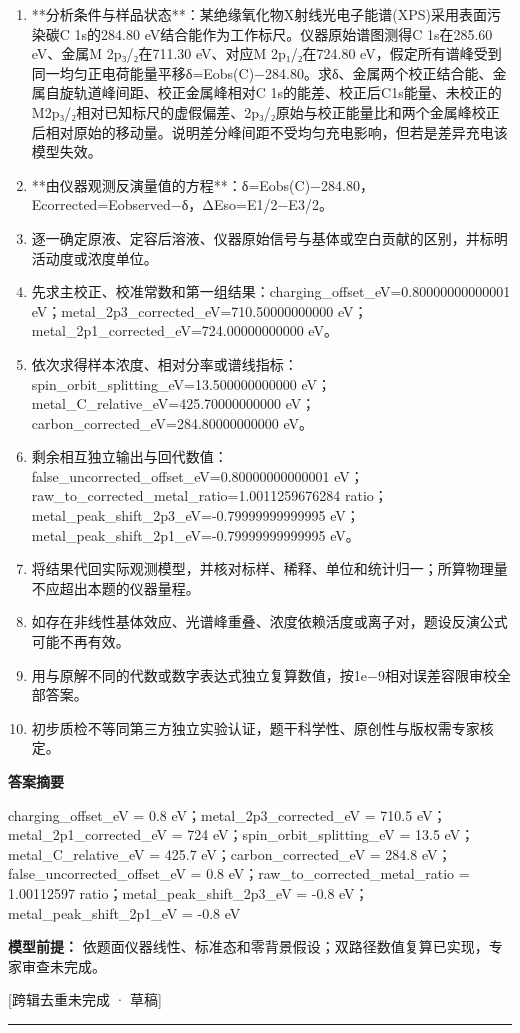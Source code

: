 \documentclass[UTF8,11pt,a4paper]{ctexart}
\begin{document}
\begin{enumerate}
\item **分析条件与样品状态**：某绝缘氧化物X射线光电子能谱(XPS)采用表面污染碳C 1s的284.80 eV结合能作为工作标尺。仪器原始谱图测得C 1s在285.60 eV、金属M 2p₃/₂在711.30 eV、对应M 2p₁/₂在724.80 eV，假定所有谱峰受到同一均匀正电荷能量平移δ=Eobs(C)−284.80。求δ、金属两个校正结合能、金属自旋轨道峰间距、校正金属峰相对C 1s的能差、校正后C1s能量、未校正的M2p₃/₂相对已知标尺的虚假偏差、2p₃/₂原始与校正能量比和两个金属峰校正后相对原始的移动量。说明差分峰间距不受均匀充电影响，但若是差异充电该模型失效。
\item **由仪器观测反演量值的方程**：δ=Eobs(C)−284.80，Ecorrected=Eobserved−δ，ΔEso=E1/2−E3/2。
\item 逐一确定原液、定容后溶液、仪器原始信号与基体或空白贡献的区别，并标明活动度或浓度单位。
\item 先求主校正、校准常数和第一组结果：charging\_offset\_eV=0.80000000000001 eV；metal\_2p3\_corrected\_eV=710.50000000000 eV；metal\_2p1\_corrected\_eV=724.00000000000 eV。
\item 依次求得样本浓度、相对分率或谱线指标：spin\_orbit\_splitting\_eV=13.500000000000 eV；metal\_C\_relative\_eV=425.70000000000 eV；carbon\_corrected\_eV=284.80000000000 eV。
\item 剩余相互独立输出与回代数值：false\_uncorrected\_offset\_eV=0.80000000000001 eV；raw\_to\_corrected\_metal\_ratio=1.0011259676284 ratio；metal\_peak\_shift\_2p3\_eV=-0.79999999999995 eV；metal\_peak\_shift\_2p1\_eV=-0.79999999999995 eV。
\item 将结果代回实际观测模型，并核对标样、稀释、单位和统计归一；所算物理量不应超出本题的仪器量程。
\item 如存在非线性基体效应、光谱峰重叠、浓度依赖活度或离子对，题设反演公式可能不再有效。
\item 用与原解不同的代数或数字表达式独立复算数值，按1e−9相对误差容限审校全部答案。
\item 初步质检不等同第三方独立实验认证，题干科学性、原创性与版权需专家核定。
\end{enumerate}
\noindent\textbf{答案摘要}\par
charging\_offset\_eV = 0.8 eV；metal\_2p3\_corrected\_eV = 710.5 eV；metal\_2p1\_corrected\_eV = 724 eV；spin\_orbit\_splitting\_eV = 13.5 eV；metal\_C\_relative\_eV = 425.7 eV；carbon\_corrected\_eV = 284.8 eV；false\_uncorrected\_offset\_eV = 0.8 eV；raw\_to\_corrected\_metal\_ratio = 1.00112597 ratio；metal\_peak\_shift\_2p3\_eV = -0.8 eV；metal\_peak\_shift\_2p1\_eV = -0.8 eV\par
\noindent\textbf{模型前提：}
依题面仪器线性、标准态和零背景假设；双路径数值复算已实现，专家审查未完成。\par
\noindent\textcolor{red!65!black}{[跨辑去重未完成 · 草稿]} \par
\medskip\hrule\medskip
{}
\end{document}
